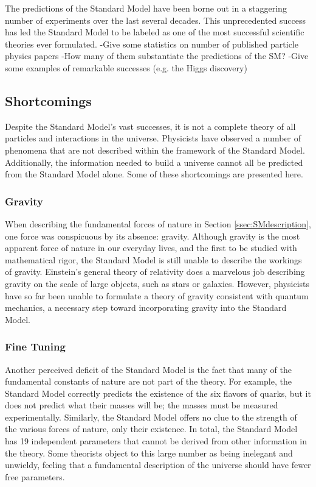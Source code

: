 The predictions of the Standard Model have been borne out in a
staggering number of experiments over the last several decades. This
unprecedented success has led the Standard Model to be labeled as one
of the most successful scientific theories ever formulated. %
-Give some statistics on number of published particle physics papers
-How many of them substantiate the predictions of the SM?
-Give some examples of remarkable successes (e.g. the Higgs discovery)

\subsection{Shortcomings}
\label{ssec:SMshortcomings}

Despite the Standard Model's vast successes, it is not a complete
theory of all particles and interactions in the universe. Physicists
have observed a number of phenomena that are not described within the
framework of the Standard Model. Additionally, the information needed to
build a universe cannot all be predicted from the Standard Model
alone. Some of these shortcomings are presented here.

\subsubsection*{Gravity}
When describing the fundamental forces of nature in Section
\ref{ssec:SMdescription}, one force was conspicuous by its absence:
gravity. Although gravity is the most apparent force of nature in our
everyday lives, and the first to be studied with mathematical rigor,
the Standard Model is still unable to describe the workings of
gravity. Einstein's general theory of relativity does a marvelous job
describing gravity on the scale of large objects, such as stars or
galaxies. However, physicists have so far been unable to formulate a
theory of gravity consistent with quantum mechanics, a necessary step
toward incorporating gravity into the Standard Model.

\subsubsection*{Fine Tuning}
Another perceived deficit of the Standard Model is the fact that many
of the fundamental constants of nature are not part of the theory. For
example, the Standard Model correctly predicts the existence of the six
flavors of quarks, but it does not predict what their masses will be;
the masses must be measured experimentally. Similarly, the Standard
Model offers no clue to the strength of the various forces of nature,
only their existence. In total, the Standard Model has 19 independent
parameters that cannot be derived from other information in the
theory. Some theorists object to this large number as being inelegant
and unwieldy, feeling that a fundamental description of the universe
should have fewer free parameters.

